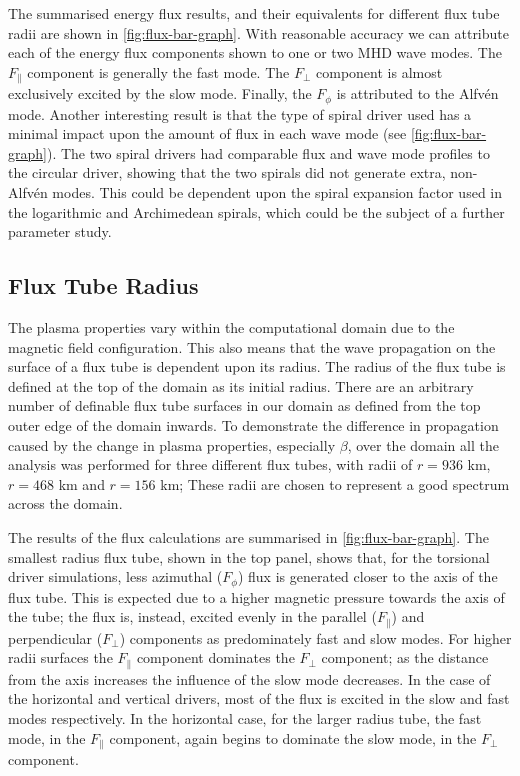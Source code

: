 The summarised energy flux results, and their equivalents for different flux tube radii are shown in \cref{fig:flux-bar-graph}.
With reasonable accuracy we can attribute each of the energy flux components shown to one or two MHD wave modes.
The $F_\parallel$ component is generally the fast mode.
The $F_\perp$ component is almost exclusively excited by the slow mode.
Finally, the $F_\phi$ is attributed to the Alfv\'en mode.
Another interesting result is that the type of spiral driver used has a minimal impact upon the amount of flux in each wave mode (see \cref{fig:flux-bar-graph}).
The two spiral drivers had comparable flux and wave mode profiles to the circular driver, showing that the two spirals did not generate extra, non-Alfv\'en modes.
This could be dependent upon the spiral expansion factor used in the logarithmic and Archimedean spirals, which could be the subject of a further parameter study.

\subsection{Flux Tube Radius}
The plasma properties vary within the computational domain due to the magnetic field configuration.
This also means that the wave propagation on the surface of a flux tube is dependent upon its radius.
The radius of the flux tube is defined at the top of the domain as its initial radius.
There are an arbitrary number of definable flux tube surfaces in our domain as defined from the top outer edge of the domain inwards.
To demonstrate the difference in propagation caused by the change in plasma properties, especially $\beta$, over the domain all the analysis was performed for three different flux tubes, with radii of $r=936$ km, $r=468$ km and  $r=156$ km; These radii are chosen to represent a good spectrum across the domain.

The results of the flux calculations are summarised in \cref{fig:flux-bar-graph}.
The smallest radius flux tube, shown in the top panel, shows that, for the torsional driver simulations, less azimuthal ($F_\phi$) flux is generated closer to the axis of the flux tube.
This is expected due to a higher magnetic pressure towards the axis of the tube; the flux is, instead, excited evenly in the parallel ($F_\parallel$) and perpendicular ($F_\perp$) components as predominately fast and slow modes.
For higher radii surfaces the $F_\parallel$ component dominates the $F_\perp$ component; as the distance from the axis increases the influence of the slow mode decreases.
In the case of the horizontal and vertical drivers, most of the flux is excited in the slow and fast modes respectively.
In the horizontal case, for the larger radius tube, the fast mode, in the $F_\parallel$ component, again begins to dominate the slow mode, in the $F_\perp$ component.

